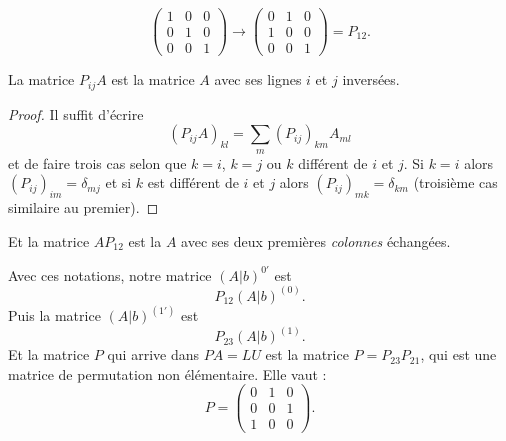 \begin{example}
    \begin{equation}
        \begin{pmatrix}
            1    &   0    &   0    \\
            0    &   1    &   0    \\
            0    &   0    &   1
        \end{pmatrix}\to
        \begin{pmatrix}
            0    &   1    &   0    \\
            1    &   0    &   0    \\
            0    &   0    &   1
        \end{pmatrix}=P_{12}.
    \end{equation}
\end{example}

\begin{lemma}
    La matrice \( P_{ij}A\) est la matrice \( A\) avec ses lignes \( i\) et \( j\) inversées.
\end{lemma}

\begin{proof}
    Il suffit d'écrire
    \begin{equation}
        (P_{ij}A)_{kl}=\sum_m(P_{ij})_{km}A_{ml}
    \end{equation}
    et de faire trois cas selon que \( k=i\), \( k=j\) ou \( k\) différent de \( i\) et \( j\). Si \( k=i\) alors \( (P_{ij})_{im}=\delta_{mj}\) et si \( k\) est différent de \( i\) et \( j\) alors \( (P_{ij})_{mk}=\delta_{km}\) (troisième cas similaire au premier).
\end{proof}

Et la matrice \( AP_{12}\) est la \( A\) avec ses deux premières \emph{colonnes} échangées.

Avec ces notations, notre matrice \( (A|b)^{0'}\) est 
\begin{equation}
    P_{12}(A|b)^{(0)}.
\end{equation}
Puis la matrice \( (A|b)^{(1')}\) est
\begin{equation}
    P_{23}(A|b)^{(1)}.
\end{equation}
Et la matrice \( P\) qui arrive dans \( PA=LU\) est la matrice \(P= P_{23}P_{21}\), qui est une matrice de permutation non élémentaire. Elle vaut :
\begin{equation}
    P=\begin{pmatrix}
        0    &   1    &   0    \\
        0    &   0    &   1    \\
        1    &   0    &   0
    \end{pmatrix}.
\end{equation}

